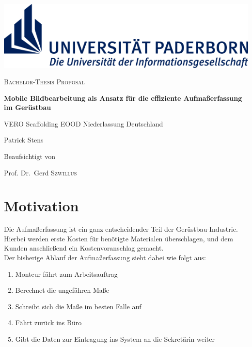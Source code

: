 \documentclass[a4paper]{article}
\begin{document}
\renewcommand{\refname}{Literatur}

\begin{titlepage}
	\centering
	\includegraphics[width=\textwidth]{logo}
	\par\vspace{5cm}

	{\scshape\Large Bachelor-Thesis Proposal\par}
	\vspace{1cm}

	{\huge\bfseries Mobile Bildbearbeitung als Ansatz für die effiziente Aufmaßerfassung im Gerüstbau\par}
	\vspace{2cm}

	{\large VERO Scaffolding EOOD Niederlassung Deutschland\par}

	{\Large Patrick Stens\par}

	\vfill

	Beaufsichtigt von\par
	Prof. Dr.~Gerd \textsc{Szwillus}	

\end{titlepage}

\section*{Motivation}
Die Aufmaßerfassung ist ein ganz entscheidender Teil der Gerüstbau-Industrie. \\
Hierbei werden erste Kosten für benötigte Materialen überschlagen, und dem Kunden anschließend ein Kostenvoranschlag gemacht. \\ 
Der bisherige Ablauf der Aufmaßerfassung sieht dabei wie folgt aus:
\begin{enumerate}
	\item Monteur fährt zum Arbeitsauftrag 
	\item Berechnet die ungefähren Maße
	\item Schreibt sich die Maße im besten Falle auf
	\item Fährt zurück ins Büro
	\item Gibt die Daten zur Eintragung ins System an die Sekretärin weiter
\end{enumerate}
\end{document}
